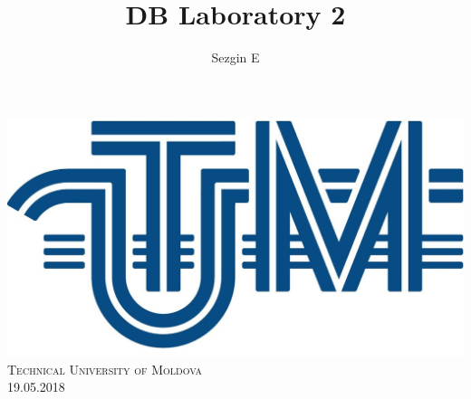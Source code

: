 \documentclass[12pt]{article}
\title{DB Laboratory 2}
\author{Sezgin E}
\begin{document}
        
        
        \begin{titlepage}
                \centering
                \vspace*{0.5 cm}
                \includegraphics[scale = 0.11]{LOGO_UTM.jpg}\\[1.0 cm]	%
                \textsc{\LARGE Technical University of Moldova}\\[2.0 cm]%
                \textsc{\Large 19.05.2018}\\[0.5 cm]		%


\end{titlepage}
\end{document}

